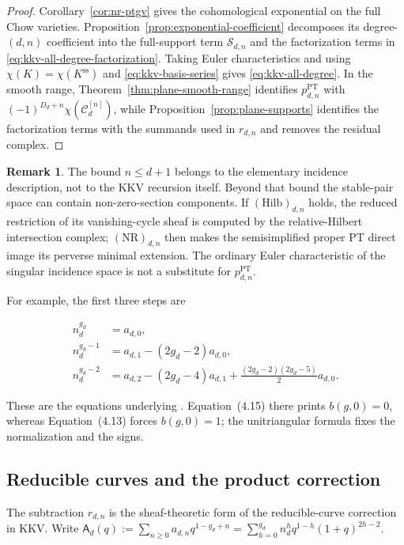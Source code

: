 \documentclass[11pt,reqno]{amsart}
\theoremstyle{definition}
\newtheorem{remark}[theorem]{Remark}
\newcommand{\PT}{\operatorname{PT}}
\begin{document}
\begin{proof}
Corollary~\ref{cor:nr-ptgv} gives the cohomological exponential on the full
Chow varieties.  Proposition~\ref{prop:exponential-coefficient} decomposes
its degree-$(d,n)$ coefficient into the full-support term
$\mathcal S_{d,n}$ and the factorization terms in
\eqref{eq:kkv-all-degree-factorization}.  Taking Euler characteristics and
using $\chi(K)=\chi(K^{\mathrm{ss}})$ and
\eqref{eq:kkv-basis-series} gives
\eqref{eq:kkv-all-degree}.  In the smooth range,
Theorem~\ref{thm:plane-smooth-range} identifies $p_{d,n}^{\PT}$ with
$(-1)^{D_d+n}\chi(\mathcal C_d^{[n]})$, while
Proposition~\ref{prop:plane-supports} identifies the factorization terms
with the summands used in $r_{d,n}$ and removes the residual complex.
\end{proof}

\begin{remark}
The bound $n\le d+1$ belongs to the elementary incidence description, not
to the KKV recursion itself.  Beyond that bound the stable-pair space can
contain non-zero-section components.  If $(\mathrm{Hilb})_{d,n}$ holds,
the reduced restriction of its vanishing-cycle sheaf is computed by the
relative-Hilbert intersection complex; $(\mathrm{NR})_{d,n}$ then makes the
semisimplified proper PT direct image its perverse minimal extension.  The ordinary Euler
characteristic of the singular incidence space is not a substitute for
$p_{d,n}^{\PT}$.
\end{remark}

For example, the first three steps are

\begin{align*}
  n_d^{g_d}&=a_{d,0},\\
  n_d^{g_d-1}&=a_{d,1}-(2g_d-2)a_{d,0},\\
  n_d^{g_d-2}
  &=a_{d,2}-(2g_d-4)a_{d,1}
    +\frac{(2g_d-2)(2g_d-5)}2a_{d,0}.
\end{align*}

These are the equations underlying
\cite[Equations~(4.13)--(4.15)]{KKV}.  Equation~(4.15) there prints
$b(g,0)=0$, whereas Equation~(4.13) forces $b(g,0)=1$; the unitriangular
formula fixes the normalization and the signs.

\subsection{Reducible curves and the product correction}

The subtraction $r_{d,n}$ is the sheaf-theoretic form of the reducible-curve
correction in KKV.  Write
$\mathsf A_d(q):=\sum_{n\ge0}a_{d,n}q^{1-g_d+n}
=\sum_{h=0}^{g_d}n_d^h q^{1-h}(1+q)^{2h-2}$.
\end{document}
